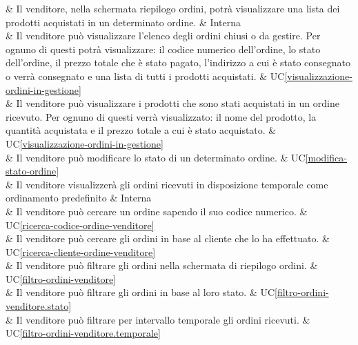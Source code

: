  & Il venditore, nella schermata riepilogo ordini, potrà visualizzare una lista dei prodotti acquistati in un determinato ordine. & Interna \\

 & Il venditore può visualizzare l'elenco degli ordini chiusi o da gestire. Per ognuno di questi potrà visualizzare: il codice numerico dell’ordine, lo stato dell’ordine, il prezzo totale che è stato pagato, l’indirizzo a cui è stato consegnato o verrà consegnato e una lista di tutti i prodotti acquistati. & UC\ref{visualizzazione-ordini-in-gestione} \\

 & Il venditore può visualizzare i prodotti che sono stati acquistati in un ordine ricevuto. Per ognuno di questi verrà visualizzato: il nome del prodotto, la quantità acquistata e il prezzo totale a cui è stato acquistato. & UC\ref{visualizzazione-ordini-in-gestione} \\

 & Il venditore può modificare lo stato di un determinato ordine. & UC\ref{modifica-stato-ordine} \\

 & Il venditore visualizzerà gli ordini ricevuti in disposizione temporale come ordinamento predefinito & Interna \\

 & Il venditore può cercare un ordine sapendo il suo codice numerico. & UC\ref{ricerca-codice-ordine-venditore} \\
     
 & Il venditore può cercare gli ordini in base al cliente che lo ha effettuato. & UC\ref{ricerca-cliente-ordine-venditore} \\
    
 & Il venditore può filtrare gli ordini nella schermata di riepilogo ordini. & UC\ref{filtro-ordini-venditore} \\
    
 & Il venditore può filtrare gli ordini in base al loro stato. & UC\ref{filtro-ordini-venditore.stato} \\
    
 & Il venditore può filtrare per intervallo temporale gli ordini ricevuti. & UC\ref{filtro-ordini-venditore.temporale} \\
    
